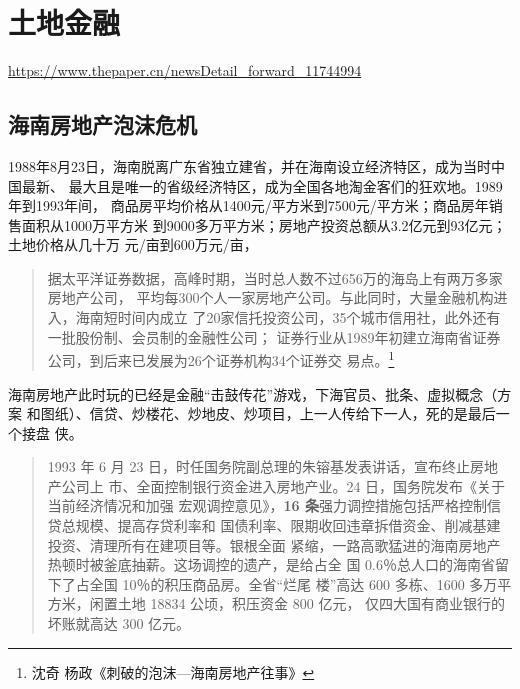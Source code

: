 \section{土地金融}
\label{sec:92tudi}
\url{https://www.thepaper.cn/newsDetail_forward_11744994}




\subsection{海南房地产泡沫危机}
\label{subsec:hainan}


1988年8月23日，海南脱离广东省独立建省，并在海南设立经济特区，成为当时中国最新、
最大且是唯一的省级经济特区，成为全国各地淘金客们的狂欢地。1989年到1993年间，
商品房平均价格从1400元/平方米到7500元/平方米；商品房年销售面积从1000万平方米
到9000多万平方米；房地产投资总额从3.2亿元到93亿元；土地价格从几十万
元/亩到600万元/亩，


\begin{quotation}
  据太平洋证券数据，高峰时期，当时总人数不过656万的海岛上有两万多家房地产公司，
  平均每300个人一家房地产公司。与此同时，大量金融机构进入，海南短时间内成立
  了20家信托投资公司，35个城市信用社，此外还有一批股份制、会员制的金融性公司；
  证券行业从1989年初建立海南省证券公司，到后来已发展为26个证券机构34个证券交
  易点。\footnote{沈奇 杨政《刺破的泡沫—海南房地产往事》}
\end{quotation}

海南房地产此时玩的已经是金融“击鼓传花”游戏，下海官员、批条、虚拟概念（方案
和图纸）、信贷、炒楼花、炒地皮、炒项目，上一人传给下一人，死的是最后一个接盘
侠。

\begin{quotation}
  1993 年 6 月 23 日，时任国务院副总理的朱镕基发表讲话，宣布终止房地产公司上
  市、全面控制银行资金进入房地产业。24 日，国务院发布《关于当前经济情况和加强
  宏观调控意见》，\textbf{16 条}强力调控措施包括严格控制信贷总规模、提高存贷利率和
  国债利率、限期收回违章拆借资金、削减基建投资、清理所有在建项目等。银根全面
  紧缩，一路高歌猛进的海南房地产热顿时被釜底抽薪。这场调控的遗产，是给占全
  国 0.6％总人口的海南省留下了占全国 10％的积压商品房。全省“烂尾
  楼”高达 600 多栋、1600 多万平方米，闲置土地 18834 公顷，积压资金 800 亿元，
  仅四大国有商业银行的坏账就高达 300 亿元。
\end{quotation}

